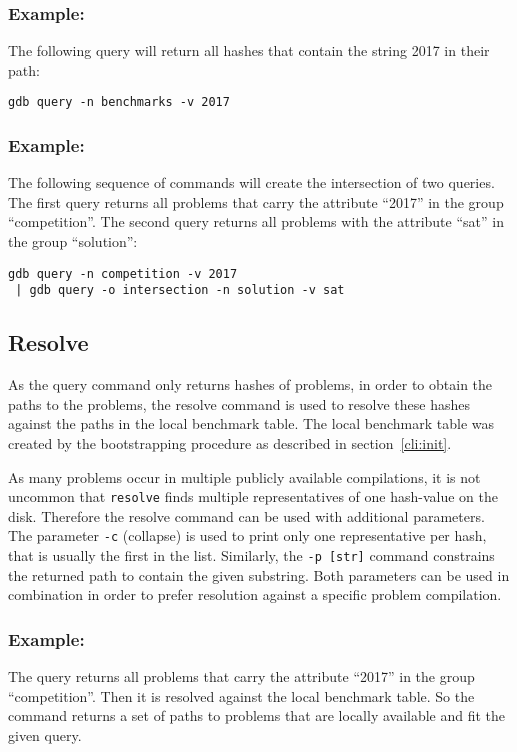 \documentclass{easychair}
\begin{document}
\subsubsection{Example:} The following query will return all hashes that contain the string 2017 in their path:
\begin{verbatim}
gdb query -n benchmarks -v 2017
\end{verbatim}

\subsubsection{Example:} The following sequence of commands will create the intersection of two queries. The first query returns all problems that carry the attribute ``2017'' in the group ``competition''. The second query returns all problems with the attribute ``sat'' in the group ``solution'':
\begin{verbatim}
gdb query -n competition -v 2017
 | gdb query -o intersection -n solution -v sat
\end{verbatim}


\subsection{Resolve}
\label{cli:resolve}

As the query command only returns hashes of problems, in order to obtain the paths to the problems, 
the resolve command is used to resolve these hashes against the paths in the local benchmark table.
The local benchmark table was created by the bootstrapping procedure as described in section~\ref{cli:init}.

As many problems occur in multiple publicly available compilations, it is not uncommon that \texttt{resolve} finds multiple representatives of one hash-value on the disk. Therefore the resolve command can be used with additional parameters. The parameter \texttt{-c} (collapse) is used to print only one representative per hash, that is usually the first in the list. Similarly, the \texttt{-p [str]} command constrains the returned path to contain the given substring. Both parameters can be used in combination in order to prefer resolution against a specific problem compilation.

\subsubsection{Example:} The query returns all problems that carry the attribute ``2017'' in the group ``competition''. Then it is resolved against the local benchmark table. So the command returns a set of paths to problems that are locally available and fit the given query.
\end{document}
